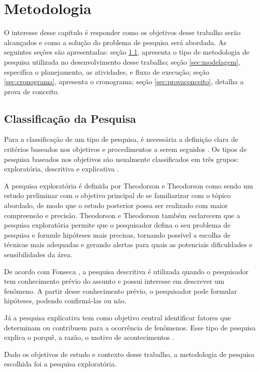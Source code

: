 \chapter[Metodologia]{Metodologia}

O interesse desse capítulo é responder como os objetivos desse trabalho serão
alcançados e como a solução do problema de pesquisa será abordada. As seguintes
seções são apresentadas: seção \ref{sec:classificacao}, apresenta o tipo de
metodologia de pesquisa utilizada no desenvolvimento desse trabalho; seção
\ref{sec:modelagem}, especifíca o planejamento, as atividades, e fluxo de
execução; seção \ref{sec:cronograma}, apresenta o cronograma; seção
\ref{sec:provaconceito}, detalha a prova de conceito.

\section{Classificação da Pesquisa}
\label{sec:classificacao}

Para a classificação de um tipo de pesquisa, é necessária a definição clara de
critérios baseados nos objetivos e procedimentos a serem seguidos
\cite{gil2002}. Os tipos de pesquisa baseados nos objetivos são usualmente
classificados em três grupos: exploratória, descritiva e explicativa
\cite{gil2002}.

A pesquisa exploratória é definida por Theodorson e Theodorson
\cite{theodorson1970} como sendo um estudo preliminar com o objetivo principal
de se familiarizar com o tópico abordado, de modo que o estudo posterior possa
ser realizado com maior compreensão e precisão. Theodorson e Theodorson
também esclarecem que a pesquisa exploratória permite que o pesquisador defina
o seu problema de pesquisa e formule hipóteses mais precisas, tornando possível
a escolha de técnicas mais adequadas e gerando alertas para quais as potenciais
dificuldades e sensibilidades da área.

De acordo com Fonseca \cite{fonseca2002}, a pesquisa descritiva é utilizada
quando o pesquisador tem conhecimento prévio do assunto e possui interesse em
descrever um fenômeno. A partir desse conhecimento prévio, o pesquisador pode
formular hipóteses, podendo confirmá-las ou não.

Já a pesquisa explicativa tem como objetivo central identificar fatores que
determinam ou contribuem para a ocorrência de fenômenos. Esse tipo de pesquisa
explica o porquê, a razão, o motivo de acontecimentos \cite{gil2002}.

Dado os objetivos de estudo e contexto desse trabalho, a metodologia de pesquisa escolhida foi a pesquisa exploratória.

